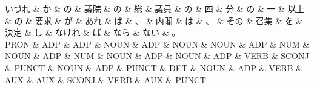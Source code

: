 \documentclass[tikz,border=5pt]{standalone}
\begin{document}
\small
\begin{dependency}[edge unit distance=12.0pt]
    \begin{deptext}[column sep=0.5em]
        いづれ \& か \& の \& 議院 \& の \& 総 \& 議員 \& の \& 四 \& 分 \& の \& 一 \& 以上 \& の \& 要求 \& が \& あれ \& ば \& 、 \& 内閣 \& は \& 、 \& その \& 召集 \& を \& 決定 \& し \& なけれ \& ば \& なら \& ない \& 。\\
        PRON \& ADP \& ADP \& NOUN \& ADP \& NOUN \& NOUN \& ADP \& NUM \& NOUN \& ADP \& NUM \& NOUN \& ADP \& NOUN \& ADP \& VERB \& SCONJ \& PUNCT \& NOUN \& ADP \& PUNCT \& DET \& NOUN \& ADP \& VERB \& AUX \& AUX \& SCONJ \& VERB \& AUX \& PUNCT\\
    \end{deptext}
\end{dependency}
\end{document}
